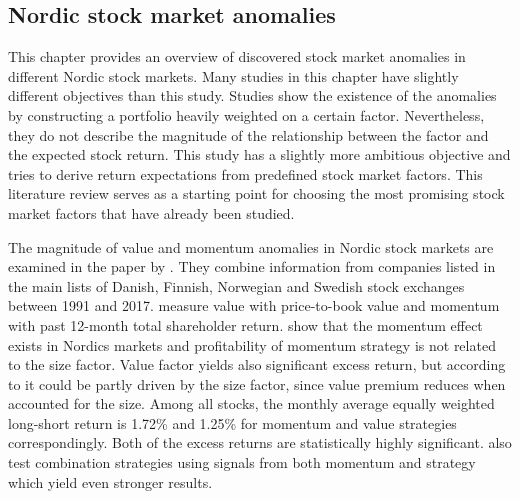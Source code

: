 \documentclass[12pt]{article}
\begin{document}
\subsection{Nordic stock market anomalies}\label{NordicStockMarketAnomalies}

This chapter provides an overview of discovered stock market anomalies in different Nordic stock markets. Many studies in this chapter have slightly different objectives than this study. Studies show the existence of the anomalies by constructing a portfolio heavily weighted on a certain factor. Nevertheless, they do not describe the magnitude of the relationship between the factor and the expected stock return. This study has a slightly more ambitious objective and tries to derive return expectations from predefined stock market factors. This literature review serves as a starting point for choosing the most promising stock market factors that have already been studied. \par

The magnitude of value and momentum anomalies in Nordic stock markets are examined in the paper by \citet{grobys}. They combine information from companies listed in the main lists of Danish, Finnish, Norwegian and Swedish stock exchanges between 1991 and 2017. \citeauthor{grobys} measure value with price-to-book value and momentum with past 12-month total shareholder return.\footnotemark {} \citeauthor{grobys} show that the momentum effect exists in Nordics markets and profitability of momentum strategy is not related to the size factor. Value factor yields also significant excess return, but according to \citeauthor{grobys} it could be partly driven by the size factor, since value premium reduces when accounted for the size. Among all stocks, the monthly average equally weighted long-short return is 1.72\% and 1.25\% for momentum and value strategies correspondingly. Both of the excess returns are statistically highly significant. \citeauthor{grobys} also test combination strategies using signals from both momentum and strategy which yield even stronger results.\footnotemark {} \par
\end{document}
